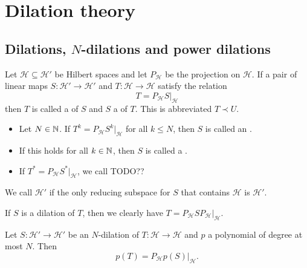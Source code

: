 \section{Dilation theory}
\subsection{Dilations, $N$-dilations and power dilations}
\begin{definition}
Let $\mathcal{H} \subseteq \mathcal{H}'$ be Hilbert spaces and let $P_\mathcal{H}$ be the projection on $\mathcal{H}$. If a pair of linear maps $S: \mathcal{H}'\to\mathcal{H}'$ and $T: \mathcal{H}\to \mathcal{H}$ satisfy the relation
\[ T = P_\mathcal{H} S |_\mathcal{H} \]
then $T$ is called a  of $S$ and $S$ a  of $T$. This is abbreviated $T\prec U$.

\begin{itemize}
\item Let $N\in\mathbb{N}$. If $T^k = P_\mathcal{H} S^k |_\mathcal{H}$ for all $k\leq N$, then $S$ is called an .
\item If this holds for all $k\in\mathbb{N}$, then $S$ is called a .
\item If $T^* = P_\mathcal{H} S^* |_\mathcal{H}$, we call TODO??
\end{itemize}
We call $\mathcal{H}'$  if the only reducing subspace for $S$ that contains $\mathcal{H}$ is $\mathcal{H}'$.
\end{definition}

If $S$ is a dilation of $T$, then we clearly have $T = P_\mathcal{H} S P_\mathcal{H}|_\mathcal{H}$.

\begin{lemma}
Let $S:\mathcal{H}'\to\mathcal{H}'$ be an $N$-dilation of $T: \mathcal{H}\to \mathcal{H}$ and $p$ a polynomial of degree at most $N$. Then
\[ p(T) = P_\mathcal{H}p(S)|_\mathcal{H}. \]
\end{lemma}


